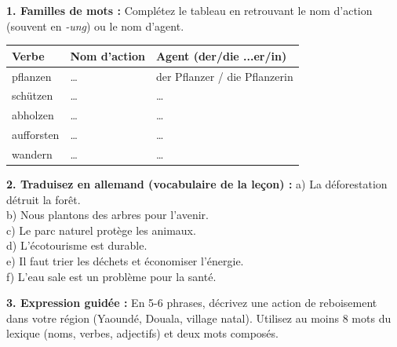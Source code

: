\documentclass[11pt]{article}
\begin{document}
\begin{exercice}
\textbf{1. Familles de mots :} Complétez le tableau en retrouvant le nom d'action (souvent en \textit{-ung}) ou le nom d'agent.
\begin{center}
\begin{tabular}{|l|l|l|}
\hline
\rowcolor{popblueL}
\textbf{Verbe} & \textbf{Nom d'action} & \textbf{Agent (der/die ...er/in)} \\
\hline
pflanzen & \dots & der Pflanzer / die Pflanzerin \\
\hline
schützen & \dots & \dots \\
\hline
abholzen & \dots & \dots \\
\hline
aufforsten & \dots & \dots \\
\hline
wandern & \dots & \dots \\
\hline
\end{tabular}
\end{center}

\textbf{2. Traduisez en allemand (vocabulaire de la leçon) :}
a) La déforestation détruit la forêt. \\
b) Nous plantons des arbres pour l'avenir. \\
c) Le parc naturel protège les animaux. \\
d) L'écotourisme est durable. \\
e) Il faut trier les déchets et économiser l'énergie. \\
f) L'eau sale est un problème pour la santé.

\textbf{3. Expression guidée :} En 5-6 phrases, décrivez une action de reboisement dans votre région (Yaoundé, Douala, village natal). Utilisez au moins 8 mots du lexique (noms, verbes, adjectifs) et deux mots composés.
\end{exercice}
\end{document}
